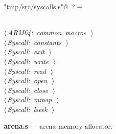 \documentclass[11pt,a4paper,twoside,openright,DIV=15]{scrbook}
\theoremstyle{definition}
\theoremstyle{plain}
\theoremstyle{remark}
\begin{document}
\begin{flushleft} \small
\begin{minipage}{\linewidth}\label{scrap86}\raggedright\small
{} \verb@"tmp/src/syscalls.s"@\nobreak\ {\footnotesize {?}}$\equiv$
\vspace{-1ex}
\begin{list}{}{} \item
\mbox{}\verb@@\\
\mbox{}\verb@@\hbox{$\langle\,${\itshape ARM64: common macros}\nobreak\ {\footnotesize {}}$\,\rangle$}\verb@@\\
\mbox{}\verb@@\hbox{$\langle\,${\itshape Syscall: constants}\nobreak\ {\footnotesize {}}$\,\rangle$}\verb@@\\
\mbox{}\verb@@\hbox{$\langle\,${\itshape Syscall: exit}\nobreak\ {\footnotesize {}}$\,\rangle$}\verb@@\\
\mbox{}\verb@@\hbox{$\langle\,${\itshape Syscall: write}\nobreak\ {\footnotesize {}}$\,\rangle$}\verb@@\\
\mbox{}\verb@@\hbox{$\langle\,${\itshape Syscall: read}\nobreak\ {\footnotesize {}}$\,\rangle$}\verb@@\\
\mbox{}\verb@@\hbox{$\langle\,${\itshape Syscall: open}\nobreak\ {\footnotesize {}}$\,\rangle$}\verb@@\\
\mbox{}\verb@@\hbox{$\langle\,${\itshape Syscall: close}\nobreak\ {\footnotesize {}}$\,\rangle$}\verb@@\\
\mbox{}\verb@@\hbox{$\langle\,${\itshape Syscall: mmap}\nobreak\ {\footnotesize {}}$\,\rangle$}\verb@@\\
\mbox{}\verb@@\hbox{$\langle\,${\itshape Syscall: lseek}\nobreak\ {\footnotesize {}}$\,\rangle$}\verb@@\\
\mbox{}\verb@@{\NWsep}
\end{list}
\vspace{-1.5ex}
\footnotesize
\begin{list}{}{\setlength{\itemsep}{-\parsep}\setlength{\itemindent}{-\leftmargin}}

\item{}
\end{list}
\end{minipage}\vspace{4ex}
\end{flushleft}
\noindent\textbf{arena.s} --- arena memory allocator:
\end{document}
